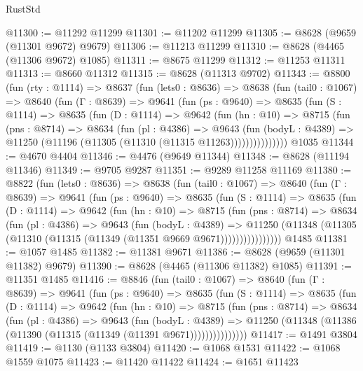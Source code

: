 \begin{lexlean}{RustStd}
\begin{coremodule}
@11300 := @11292 @11299
@11301 := @11202 @11299
@11305 := @8628 (@9659 (@11301 @9672) @9679)
@11306 := @11213 @11299
@11310 := @8628 (@4465 (@11306 @9672) @1085)
@11311 := @8675 @11299
@11312 := @11253 @11311
@11313 := @8660 @11312
@11315 := @8628 (@11313 @9702)
@11343 := @8800
    (fun (rty : @1114) =>
    @8637
      (fun (lets0 : @8636) =>
      @8638
        (fun (tail0 : @1067) =>
        @8640
          (fun (Γ : @8639) =>
          @9641
            (fun (ps : @9640) =>
            @8635
              (fun (S : @1114) =>
              @8635
                (fun (D : @1114) =>
                @9642
                  (fun (hn : @10) =>
                  @8715
                    (fun (pns : @8714) =>
                    @8634
                      (fun (pl : @4386) =>
                      @9643
                        (fun (bodyL : @4389) =>
                        @11250 (@11196 (@11305 (@11310 (@11315 @11263)))))))))))))))
    @1035
@11344 := @4670 @4404
@11346 := @4476 (@9649 @11344)
@11348 := @8628 (@11194 @11346)
@11349 := @9705 @9287
@11351 := @9289 @11258 @11169
@11380 := @8822
    (fun (lets0 : @8636) =>
    @8638
      (fun (tail0 : @1067) =>
      @8640
        (fun (Γ : @8639) =>
        @9641
          (fun (ps : @9640) =>
          @8635
            (fun (S : @1114) =>
            @8635
              (fun (D : @1114) =>
              @9642
                (fun (hn : @10) =>
                @8715
                  (fun (pns : @8714) =>
                  @8634
                    (fun (pl : @4386) =>
                    @9643
                      (fun (bodyL : @4389) =>
                      @11250
                        (@11348 (@11305 (@11310 (@11315 (@11349 (@11351 @9669 @9671))))))))))))))))
    @1485
@11381 := @1057 @1485
@11382 := @11381 @9671
@11386 := @8628 (@9659 (@11301 @11382) @9679)
@11390 := @8628 (@4465 (@11306 @11382) @1085)
@11391 := @11351 @1485
@11416 := @8846
    (fun (tail0 : @1067) =>
    @8640
      (fun (Γ : @8639) =>
      @9641
        (fun (ps : @9640) =>
        @8635
          (fun (S : @1114) =>
          @8635
            (fun (D : @1114) =>
            @9642
              (fun (hn : @10) =>
              @8715
                (fun (pns : @8714) =>
                @8634
                  (fun (pl : @4386) =>
                  @9643
                    (fun (bodyL : @4389) =>
                    @11250 (@11348 (@11386 (@11390 (@11315 (@11349 (@11391 @9671)))))))))))))))
@11417 := @1491 @3804
@11419 := @1130 (@1133 @3804)
@11420 := @1068 @1531
@11422 := @1068 @1559 @1075
@11423 := @11420 @11422
@11424 := @1651 @11423

\end{coremodule}
\end{lexlean}
